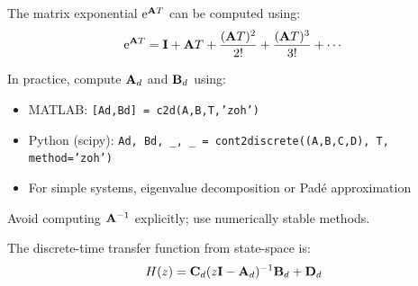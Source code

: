 The matrix exponential $\mathrm{e}^{\mathbf{A} T}$ can be computed using:
\begin{equation}
\mathrm{e}^{\mathbf{A} T} = \mathbf{I} + \mathbf{A} T + \frac{(\mathbf{A} T)^2}{2!} + \frac{(\mathbf{A} T)^3}{3!} + \cdots
\end{equation}

\begin{practicalbox}[title=Computing Discrete-Time Matrices]
In practice, compute $\mathbf{A}_d$ and $\mathbf{B}_d$ using:
\begin{itemize}
    \item MATLAB: \texttt{[Ad,Bd] = c2d(A,B,T,'zoh')}
    \item Python (scipy): \texttt{Ad, Bd, \_, \_ = cont2discrete((A,B,C,D), T, method='zoh')}
    \item For simple systems, eigenvalue decomposition or Pad\'e approximation
\end{itemize}
Avoid computing $\mathbf{A}^{-1}$ explicitly; use numerically stable methods.
\end{practicalbox}

The discrete-time transfer function from state-space is:
\begin{equation}
H(z) = \mathbf{C}_d(z\mathbf{I} - \mathbf{A}_d)^{-1}\mathbf{B}_d + \mathbf{D}_d
\end{equation}

